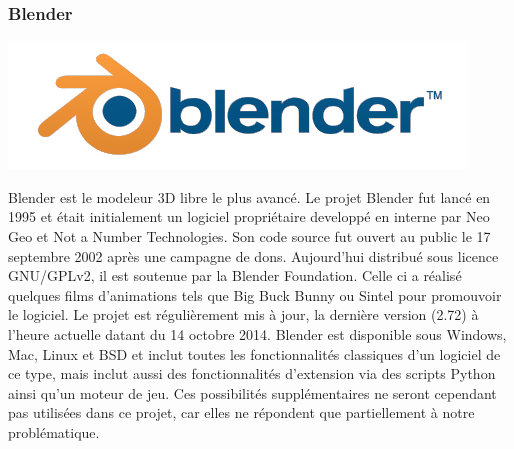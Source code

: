 	\subsubsection{Blender}
		\noindent\begin{minipage}{0.2\textwidth}
			\includegraphics[width=\linewidth]{1-PreEtude/img/blender_logo}
			\end{minipage}
			\hfill
			\begin{minipage}{0.8\textwidth}
			Blender\cite{blender} est le modeleur 3D libre le plus avancé. Le projet Blender fut lancé en 1995 et était initialement un logiciel propriétaire developpé en interne par Neo Geo et Not a Number Technologies.
			Son code source fut ouvert au public le 17 septembre 2002 après une campagne de dons. Aujourd'hui distribué sous licence GNU/GPLv2, il est soutenue par la Blender Foundation. Celle ci a réalisé quelques films d'animations tels que Big Buck Bunny ou Sintel pour promouvoir le logiciel.
			Le projet est régulièrement mis à jour, la dernière version (2.72) à l'heure actuelle datant du 14 octobre 2014.
			Blender est disponible sous Windows, Mac, Linux et BSD et inclut toutes les fonctionnalités classiques d'un logiciel de ce type, mais inclut aussi des fonctionnalités d'extension via des scripts Python ainsi qu'un moteur de jeu.
			Ces possibilités supplémentaires ne seront cependant pas utilisées dans ce projet, car elles ne répondent que partiellement à notre problématique.
		\end{minipage}


